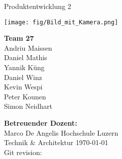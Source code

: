     \begin{titlepage}
        \begin{center}
            \makeatletter
            {\Large Produktentwicklung 2} \\
            \vfill{}
            {\LARGE \@title}
            \vfill{}
            \begin{minipage}{0.60\textwidth}
                \texttt{[image: fig/Bild\_mit\_Kamera.png]}
            \end{minipage}
            \begin{minipage}{0.16\textwidth}
                {\textbf{Team 27} \\
                Andriu Maissen \\
                Daniel Mathis \\
                Yannik Küng \\
                Daniel Winz \\
                Kevin Wespi \\
                Peter Kounen \\
                Simon Neidhart}
            \end{minipage}
            \vfill{}
            {\textbf{Betreuender Dozent:} \\
            Marco De Angelis}
            \vfill{}
            {Hochschule Luzern \\
            Technik \& Architektur}
            \vfill
            {\today \\
            Git revision: 
            }
            \makeatother
        \end{center}
    \end{titlepage}
